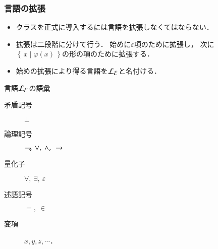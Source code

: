 \documentclass[dvipdfmx,10pt,notheorems]{beamer}
\theoremstyle{definition}
\newcommand{\lang}[1]{\mathcal{L}_{\scalebox{1.2}{$#1$}}} %
\newcommand{\Set}[2]{\left\{\, #1 \mid #2\, \right\}} %
\newcommand{\negation}{\rightharpoondown\hspace{-0.25em}} %
\newcommand{\rarrow}{\hspace{0.25em}\rightarrow\hspace{0.25em}} %
\begin{document}
\begin{frame}\frametitle{言語の拡張}
	\begin{itemize}
		\item クラスを正式に導入するには言語を拡張しなくてはならない．
		\item 拡張は二段階に分けて行う．
			始めに$\varepsilon$項のために拡張し，
			次に$\Set{x}{\varphi(x)}$の形の項のために拡張する．
			
		\item 始めの拡張により得る言語を$\lang{\varepsilon}$と名付ける．
	\end{itemize}

	\begin{exampleblock}{言語$\lang{\varepsilon}$の語彙}
		\begin{description}
			\item[矛盾記号] $\bot$
			\item[論理記号] $\negation,\ \vee,\ \wedge,\ \rarrow$
			\item[量化子] $\forall,\ \exists,\ \varepsilon$
			\item[述語記号] $=,\ \in$
			\item[変項] $x,y,z,\cdots$．
		\end{description}
	\end{exampleblock}
\end{frame}
\end{document}
